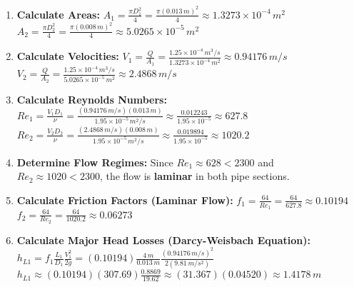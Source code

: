 \begin{enumerate}
\def\labelenumi{\arabic{enumi}.}
\item
  \textbf{Calculate Areas:}
  \(A_1 = \frac{\pi D_1^2}{4} = \frac{\pi (0.013 \, m)^2}{4} \approx 1.3273 \times 10^{-4} \, m^2\)
  \(A_2 = \frac{\pi D_2^2}{4} = \frac{\pi (0.008 \, m)^2}{4} \approx 5.0265 \times 10^{-5} \, m^2\)
\item
  \textbf{Calculate Velocities:}
  \(V_1 = \frac{Q}{A_1} = \frac{1.25 \times 10^{-4} \, m^3/s}{1.3273 \times 10^{-4} \, m^2} \approx 0.94176 \, m/s\)
  \(V_2 = \frac{Q}{A_2} = \frac{1.25 \times 10^{-4} \, m^3/s}{5.0265 \times 10^{-5} \, m^2} \approx 2.4868 \, m/s\)
\item
  \textbf{Calculate Reynolds Numbers:}
  \(Re_1 = \frac{V_1 D_1}{\nu} = \frac{(0.94176 \, m/s)(0.013 \, m)}{1.95 \times 10^{-5} \, m^2/s} \approx \frac{0.012243}{1.95 \times 10^{-5}} \approx 627.8\)
  \(Re_2 = \frac{V_2 D_2}{\nu} = \frac{(2.4868 \, m/s)(0.008 \, m)}{1.95 \times 10^{-5} \, m^2/s} \approx \frac{0.019894}{1.95 \times 10^{-5}} \approx 1020.2\)
\item
  \textbf{Determine Flow Regimes:} Since \(Re_1 \approx 628 < 2300\) and
  \(Re_2 \approx 1020 < 2300\), the flow is \textbf{laminar} in both
  pipe sections.
\item
  \textbf{Calculate Friction Factors (Laminar Flow):}
  \(f_1 = \frac{64}{Re_1} = \frac{64}{627.8} \approx 0.10194\)
  \(f_2 = \frac{64}{Re_2} = \frac{64}{1020.2} \approx 0.06273\)
\item
  \textbf{Calculate Major Head Losses (Darcy-Weisbach Equation):}
  \(h_{L1} = f_1 \frac{L_1}{D_1} \frac{V_1^2}{2g} = (0.10194) \frac{4 \, m}{0.013 \, m} \frac{(0.94176 \, m/s)^2}{2(9.81 \, m/s^2)}\)
  \(h_{L1} \approx (0.10194)(307.69) \frac{0.8869}{19.62} \approx (31.367)(0.04520) \approx 1.4178 \, m\)


\end{enumerate}
